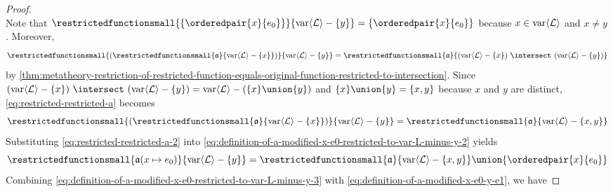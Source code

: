 \begin{proof}
\begin{equation}
    \end{equation}
    Note that \( \restrictedfunctionsmall{ \mleft\{ \orderedpair{x}{e_{0}} \mright\} }{\folvars{\mathcal{L}} - \mleft\{ y \mright\}} = \mleft\{ \orderedpair{x}{e_{0}} \mright\} \) because \( x \in \operatorname{var} \langle\mathcal{L}\rangle \) and \( x \neq y \).
    Moreover,
    \begin{equation}
        \label{eq:restricted-restricted-a}
        \restrictedfunctionsmall{ \mleft( \restrictedfunctionsmall{\mathfrak{a}}{ \folvars{\mathcal{L}} - \mleft\{ x \mright\} } \mright) }{ \folvars{\mathcal{L}} - \mleft\{ y \mright\} } = \restrictedfunctionsmall{\mathfrak{a}}{ \mleft( \folvars{\mathcal{L}} - \mleft\{ x \mright\} \mright) \,\,{\intersect}\,\,  \mleft( \folvars{\mathcal{L}} - \mleft\{ y \mright\} \mright) }
    \end{equation}
    by \cref{thm:metatheory-restriction-of-restricted-function-equals-original-function-restricted-to-intersection}.
    Since \( \mleft( \folvars{\mathcal{L}} - \mleft\{ x \mright\} \mright) \,\,{\intersect}\,\, \mleft( \folvars{\mathcal{L}} - \mleft\{ y \mright\} \mright) = \folvars{\mathcal{L}} - \mleft( \mleft\{ x \mright\} \union \mleft\{ y \mright\} \mright) \) and \( \mleft\{ x \mright\} \union \mleft\{ y \mright\} = \mleft\{ x, y \mright\} \) because
    \( x \) and \( y \) are distinct, \eqref{eq:restricted-restricted-a} becomes
    \begin{equation}
        \label{eq:restricted-restricted-a-2}
        \restrictedfunctionsmall{ \mleft( \restrictedfunctionsmall{\mathfrak{a}}{ \folvars{\mathcal{L}} - \mleft\{ x \mright\} } \mright) }{ \folvars{\mathcal{L}} - \mleft\{ y \mright\} } = \restrictedfunctionsmall{\mathfrak{a}}{ \folvars{\mathcal{L}} - \mleft\{ x, y \mright\} }
    \end{equation}
    Substituting \eqref{eq:restricted-restricted-a-2} into \eqref{eq:definition-of-a-modified-x-e0-restricted-to-var-L-minus-y-2} yields
    \begin{equation}
        \label{eq:definition-of-a-modified-x-e0-restricted-to-var-L-minus-y-3}
        \restrictedfunctionsmall{ \folmodifiedvariableassignmentfunction{\mathfrak{a}}{x}{e_{0}} }{\folvars{\mathcal{L}} - \mleft\{ y \mright\}} =
        \restrictedfunctionsmall{\mathfrak{a}}{ \folvars{\mathcal{L}} - \mleft\{ x, y \mright\} } \union \mleft\{ \orderedpair{x}{e_{0}} \mright\}
    \end{equation}
    Combining \eqref{eq:definition-of-a-modified-x-e0-restricted-to-var-L-minus-y-3} with \eqref{eq:definition-of-a-modified-x-e0-y-e1}, we have

\end{proof}
